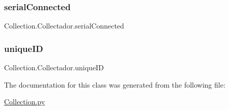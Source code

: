 \subsubsection{\texorpdfstring{serialConnected}{serialConnected}}
{\footnotesize\ttfamily Collection.\+Collectador.\+serial\+Connected}

\mbox{\label{class_collection_1_1_collectador_a13c3d036cddedace173688b51df275d5}} 
\subsubsection{\texorpdfstring{uniqueID}{uniqueID}}
{\footnotesize\ttfamily Collection.\+Collectador.\+unique\+ID}



The documentation for this class was generated from the following file\+:\begin{DoxyCompactItemize}
\item 
\mbox{\hyperlink{_collection_8py}{Collection.\+py}}\end{DoxyCompactItemize}
